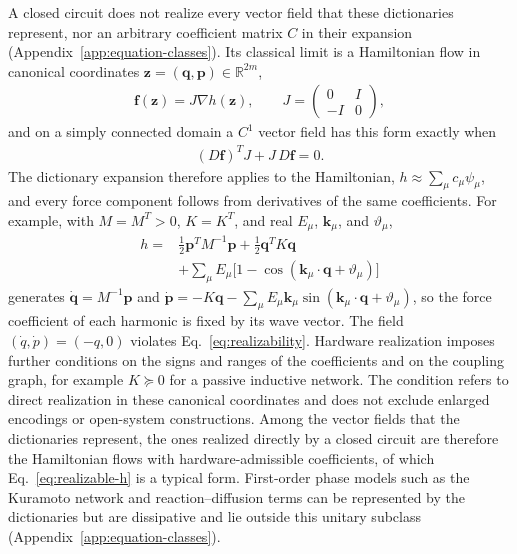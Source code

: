 \documentclass[pra,twocolumn,superscriptaddress,nofootinbib,floatfix]{revtex4-2}
\theoremstyle{remark}
\begin{document}
A closed circuit does not realize every vector field that these dictionaries represent, nor an arbitrary coefficient matrix \(C\) in their expansion (Appendix~\ref{app:equation-classes}). Its classical limit is a Hamiltonian flow in canonical coordinates \(\mathbf z=(\mathbf q,\mathbf p)\in\mathbb R^{2m}\),
\begin{align}
\mathbf f(\mathbf z)=J\nabla h(\mathbf z),\qquad J=\begin{pmatrix}0&I\\-I&0\end{pmatrix},
\label{eq:hamiltonian-flow}
\end{align}
and on a simply connected domain a \(C^1\) vector field has this form exactly when
\begin{align}
(D\mathbf f)^{T}J+J\,D\mathbf f=0.
\label{eq:realizability}
\end{align}
The dictionary expansion therefore applies to the Hamiltonian, \(h\approx\sum_\mu c_\mu\psi_\mu\), and every force component follows from derivatives of the same coefficients. For example, with \(M=M^T>0\), \(K=K^T\), and real \(E_\mu\), \(\mathbf k_\mu\), and \(\vartheta_\mu\),
\begin{align}
h={}&\tfrac12\mathbf p^{T}M^{-1}\mathbf p+\tfrac12\mathbf q^{T}K\mathbf q\nonumber\\
&+\sum_\mu E_\mu\big[1-\cos(\mathbf k_\mu\cdot\mathbf q+\vartheta_\mu)\big]
\label{eq:realizable-h}
\end{align}
generates \(\dot{\mathbf q}=M^{-1}\mathbf p\) and \(\dot{\mathbf p}=-K\mathbf q-\sum_\mu E_\mu\mathbf k_\mu\sin(\mathbf k_\mu\cdot\mathbf q+\vartheta_\mu)\), so the force coefficient of each harmonic is fixed by its wave vector. The field \((\dot q,\dot p)=(-q,0)\) violates Eq.~\eqref{eq:realizability}. Hardware realization imposes further conditions on the signs and ranges of the coefficients and on the coupling graph, for example \(K\succeq0\) for a passive inductive network. The condition refers to direct realization in these canonical coordinates and does not exclude enlarged encodings or open-system constructions. Among the vector fields that the dictionaries represent, the ones realized directly by a closed circuit are therefore the Hamiltonian flows with hardware-admissible coefficients, of which Eq.~\eqref{eq:realizable-h} is a typical form. First-order phase models such as the Kuramoto network and reaction--diffusion terms can be represented by the dictionaries but are dissipative and lie outside this unitary subclass (Appendix~\ref{app:equation-classes}).
\end{document}
